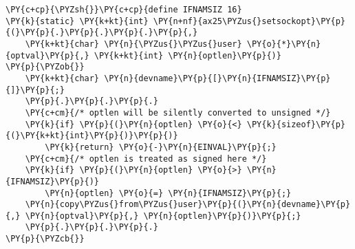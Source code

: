 \begin{Verbatim}[commandchars=\\\{\}]
\PY{c+cp}{\PYZsh{}}\PY{c+cp}{define IFNAMSIZ 16}
\PY{k}{static} \PY{k+kt}{int} \PY{n+nf}{ax25\PYZus{}setsockopt}\PY{p}{(}\PY{p}{.}\PY{p}{.}\PY{p}{.}\PY{p}{,}
    \PY{k+kt}{char} \PY{n}{\PYZus{}\PYZus{}user} \PY{o}{*}\PY{n}{optval}\PY{p}{,} \PY{k+kt}{int} \PY{n}{optlen}\PY{p}{)}
\PY{p}{\PYZob{}}
    \PY{k+kt}{char} \PY{n}{devname}\PY{p}{[}\PY{n}{IFNAMSIZ}\PY{p}{]}\PY{p}{;}
    \PY{p}{.}\PY{p}{.}\PY{p}{.}
    \PY{c+cm}{/* optlen will be silently converted to unsigned */}
    \PY{k}{if} \PY{p}{(}\PY{n}{optlen} \PY{o}{<} \PY{k}{sizeof}\PY{p}{(}\PY{k+kt}{int}\PY{p}{)}\PY{p}{)}
        \PY{k}{return} \PY{o}{-}\PY{n}{EINVAL}\PY{p}{;}
    \PY{c+cm}{/* optlen is treated as signed here */}
    \PY{k}{if} \PY{p}{(}\PY{n}{optlen} \PY{o}{>} \PY{n}{IFNAMSIZ}\PY{p}{)}
        \PY{n}{optlen} \PY{o}{=} \PY{n}{IFNAMSIZ}\PY{p}{;}
    \PY{n}{copy\PYZus{}from\PYZus{}user}\PY{p}{(}\PY{n}{devname}\PY{p}{,} \PY{n}{optval}\PY{p}{,} \PY{n}{optlen}\PY{p}{)}\PY{p}{;}
    \PY{p}{.}\PY{p}{.}\PY{p}{.}
\PY{p}{\PYZcb{}}
\end{Verbatim}
